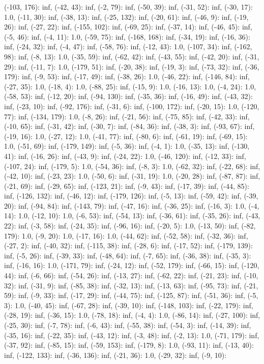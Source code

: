 \documentclass[parskip=half]{scrartcl}
\begin{document}
(-103, 176): inf, (-42, 43): inf, (-2, 79): inf, (-50, 39): inf, (-31, 52): inf, (-30, 17): 1.0, (-11, 30): inf, (-38, 13): inf, (-25, 132): inf, (-20, 61): inf, (-46, 9): inf, (-19, 26): inf, (-27, 22): inf, (-155, 102): inf, (-69, 25): inf, (-37, 14): inf, (-46, 45): inf, (-5, 46): inf, (-4, 11): 1.0, (-59, 75): inf, (-168, 168): inf, (-34, 19): inf, (-16, 36): inf, (-24, 32): inf, (-4, 47): inf, (-58, 76): inf, (-12, 43): 1.0, (-107, 34): inf, (-162, 98): inf, (-8, 13): 1.0, (-35, 59): inf, (-62, 42): inf, (-43, 55): inf, (-42, 20): inf, (-31, 29): inf, (-11, 7): 1.0, (-179, 51): inf, (-20, 38): inf, (-19, 3): inf, (-73, 32): inf, (-36, 179): inf, (-9, 53): inf, (-17, 49): inf, (-38, 26): 1.0, (-46, 22): inf, (-146, 84): inf, (-27, 35): 1.0, (-18, 4): 1.0, (-88, 25): inf, (-15, 9): 1.0, (-16, 13): 1.0, (-4, 24): 1.0, (-58, 53): inf, (-12, 20): inf, (-94, 130): inf, (-35, 36): inf, (-16, 49): inf, (-43, 32): inf, (-23, 10): inf, (-92, 176): inf, (-31, 6): inf, (-100, 172): inf, (-20, 15): 1.0, (-120, 77): inf, (-134, 179): 1.0, (-8, 26): inf, (-21, 56): inf, (-75, 85): inf, (-42, 33): inf, (-10, 65): inf, (-31, 42): inf, (-30, 7): inf, (-84, 36): inf, (-38, 3): inf, (-93, 67): inf, (-19, 16): 1.0, (-27, 12): 1.0, (-41, 77): inf, (-80, 6): inf, (-61, 19): inf, (-69, 15): 1.0, (-51, 69): inf, (-179, 149): inf, (-5, 36): inf, (-4, 1): 1.0, (-35, 13): inf, (-130, 41): inf, (-16, 26): inf, (-43, 9): inf, (-24, 22): 1.0, (-46, 120): inf, (-12, 33): inf, (-107, 24): inf, (-179, 5): 1.0, (-54, 36): inf, (-8, 3): 1.0, (-62, 32): inf, (-22, 68): inf, (-42, 10): inf, (-23, 23): 1.0, (-50, 6): inf, (-31, 19): 1.0, (-20, 28): inf, (-87, 87): inf, (-21, 69): inf, (-29, 65): inf, (-123, 21): inf, (-9, 43): inf, (-17, 39): inf, (-44, 85): inf, (-126, 132): inf, (-46, 12): inf, (-179, 126): inf, (-5, 13): inf, (-59, 42): inf, (-39, 20): inf, (-94, 84): inf, (-143, 79): inf, (-47, 16): inf, (-36, 25): inf, (-16, 3): 1.0, (-4, 14): 1.0, (-12, 10): 1.0, (-6, 53): inf, (-54, 13): inf, (-36, 61): inf, (-35, 26): inf, (-43, 22): inf, (-3, 58): inf, (-24, 35): inf, (-96, 16): inf, (-20, 5): 1.0, (-13, 50): inf, (-82, 179): 1.0, (-9, 20): 1.0, (-17, 16): 1.0, (-44, 62): inf, (-52, 58): inf, (-32, 36): inf, (-27, 2): inf, (-40, 32): inf, (-115, 38): inf, (-28, 6): inf, (-17, 52): inf, (-179, 139): inf, (-5, 26): inf, (-39, 33): inf, (-48, 64): inf, (-7, 65): inf, (-36, 38): inf, (-35, 3): inf, (-16, 16): 1.0, (-171, 79): inf, (-24, 12): inf, (-52, 179): inf, (-66, 15): inf, (-120, 44): inf, (-6, 66): inf, (-54, 26): inf, (-13, 27): inf, (-62, 22): inf, (-21, 23): inf, (-10, 32): inf, (-31, 9): inf, (-85, 38): inf, (-32, 13): inf, (-13, 63): inf, (-95, 73): inf, (-21, 59): inf, (-9, 33): inf, (-17, 29): inf, (-44, 75): inf, (-125, 87): inf, (-51, 36): inf, (-5, 3): 1.0, (-40, 45): inf, (-67, 28): inf, (-39, 10): inf, (-148, 103): inf, (-22, 179): inf, (-28, 19): inf, (-36, 15): 1.0, (-78, 18): inf, (-4, 4): 1.0, (-86, 14): inf, (-27, 100): inf, (-25, 30): inf, (-7, 78): inf, (-6, 43): inf, (-55, 38): inf, (-54, 3): inf, (-14, 39): inf, (-35, 16): inf, (-22, 35): inf, (-43, 12): inf, (-3, 48): inf, (-2, 13): 1.0, (-71, 179): inf, (-37, 92): inf, (-85, 15): inf, (-59, 153): inf, (-179, 8): 1.0, (-93, 11): inf, (-13, 40): inf, (-122, 133): inf, (-36, 136): inf, (-21, 36): 1.0, (-29, 32): inf, (-9, 10): 
\end{document}
